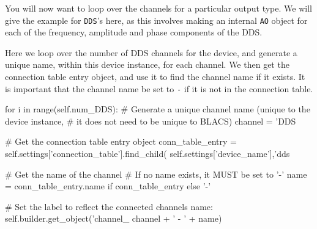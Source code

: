 \documentclass[12pt]{article}
\begin{document}
You will now want to loop over the channels for a particular output type. We will give the example for \texttt{DDS}'s here, as this involves making an internal \texttt{AO} object for each of the frequency, amplitude and phase components of the DDS.

Here we loop over the number of DDS channels for the device, and generate a unique name, within this device instance, for each channel. We then get the connection table entry object, and use it to find the channel name if it exists. It is important that the channel name be set to \texttt{-} if it is not in the connection table.
\begin{python}
        for i in range(self.num_DDS):
            # Generate a unique channel name (unique to the device instance,
            # it does not need to be unique to BLACS)
            channel = 'DDS %
            
            # Get the connection table entry object
            conn_table_entry = self.settings['connection_table'].find_child(
                self.settings['device_name'],'dds %
                
            # Get the name of the channel
            # If no name exists, it MUST be set to '-'
            name = conn_table_entry.name if conn_table_entry else '-'
            
            # Set the label to reflect the connected channels name:
            self.builder.get_object('channel_%
                channel + ' - ' + name)
\end{python}  
\end{document}
